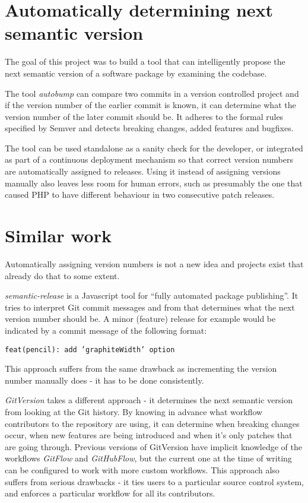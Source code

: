 \documentclass{l4proj}
\begin{document}
\section{Automatically determining next semantic version}
The goal of this project was to build a tool that can intelligently propose
the next semantic version of a software package by examining the codebase.

The tool \textit{autobump} can compare two commits in a version controlled
project and if the version number of the earlier commit is known, it can determine
what the version number of the later commit should be. It adheres to the formal
rules specified by Semver\cite{SemanticVersioning} and detects breaking changes,
added features and bugfixes.


The tool can be used standalone as a sanity check for the developer, or integrated
as part of a continuous deployment mechanism so that correct version numbers are
automatically assigned to releases. Using it instead of assigning versions manually
also leaves less room for human errors, such as presumably the one that caused PHP
to have different behaviour in two consecutive patch releases.


\section{Similar work}
Automatically assigning version numbers is not a new idea and projects
exist that already do that to some extent.

\textit{semantic-release}\cite{SemanticRelease} is a Javascript tool
for ``fully automated package publishing''. It tries to interpret Git
commit messages and from that determines what the next version number
should be. A minor (feature) release for example would be indicated by
a commit message of the following format:
\begin{center}
\texttt{feat(pencil): add 'graphiteWidth' option}
\end{center}
This approach suffers from the same drawback as incrementing the
version number manually does - it has to be done consistently.

\textit{GitVersion}\cite{GitVersion} takes a different approach - it
determines the next semantic version from looking at the Git history.
By knowing in advance what workflow contributors to the repository are
using, it can determine when breaking changes occur, when new features
are being introduced and when it's only patches that are going
through. Previous versions of GitVersion have implicit knowledge of
the workflows \textit{GitFlow} and \textit{GitHubFlow}, but the
current one at the time of writing can be configured to work with
more custom workflows. This approach also suffers from serious
drawbacks - it ties users to a particular source control system, and
enforces a particular workflow for all its contributors.
\end{document}
